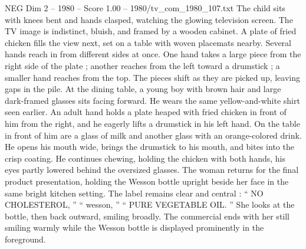\begin{textsample}{NEG Dim 2 – 1980 – Score 1.00 – 1980/tv\_com\_1980\_107.txt}
The child sits with knees bent and hands clasped, watching the glowing television screen.
The TV image is indistinct, bluish, and framed by a wooden cabinet.
A plate of fried chicken fills the view next, set on a table with woven placemats nearby.
Several hands reach in from different sides at once.
One hand takes a large piece from the right side of the plate ; another reaches from the left toward a drumstick ; a smaller hand reaches from the top.
The pieces shift as they are picked up, leaving gaps in the pile.
At the dining table, a young boy with brown hair and large dark-framed glasses sits facing forward.
He wears the same yellow-and-white shirt seen earlier.
An adult hand holds a plate heaped with fried chicken in front of him from the right, and he eagerly lifts a drumstick in his left hand.
On the table in front of him are a glass of milk and another glass with an orange-colored drink.
He opens his mouth wide, brings the drumstick to his mouth, and bites into the crisp coating.
He continues chewing, holding the chicken with both hands, his eyes partly lowered behind the oversized glasses.
The woman returns for the final product presentation, holding the Wesson bottle upright beside her face in the same bright kitchen setting.
The label remains clear and central : “ NO CHOLESTEROL, ” “ wesson, ” “ PURE VEGETABLE OIL. ” She looks at the bottle, then back outward, smiling broadly.
The commercial ends with her still smiling warmly while the Wesson bottle is displayed prominently in the foreground.

\end{textsample}
